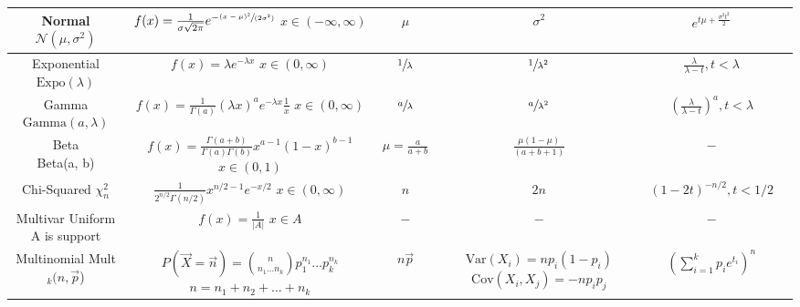 \documentclass[10pt,landscape]{article}
\theoremstyle{definition}
\newcommand{\var}{\textrm{Var}}
\newcommand{\cov}{\textrm{Cov}}
\newcommand{\N}{\mathcal{N}}
\newcommand{\Beta}{\textrm{Beta}}
\newcommand{\Gam}{\textrm{Gamma}}
\newcommand{\Expo}{\textrm{Expo}}
\newcommand{\Mult}{\textrm{Mult}}
\begin{document}
\begin{sidewaystable}
\begin{center}
\begin{tabular}{cccccc}
    \hline
    \shortstack{Normal \\ $\N(\mu, \sigma^2)$} & \shortstack{$f(x) = \frac{1}{\sigma \sqrt{2\pi}} e^{-\sfrac{(x - \mu)^2}{(2 \sigma^2)}}$ \\ $x \in (-\infty, \infty)$} & $\mu$  & $\sigma^2$ & $e^{t\mu + \frac{\sigma^2t^2}{2}}$\\
    \hline
    \shortstack{Exponential \\ $\Expo(\lambda)$} & \shortstack{$f(x) = \lambda e^{-\lambda x}$\\$ x \in (0, \infty)$} & $\sfrac{1}{\lambda}$  & $\sfrac{1}{\lambda^2}$ & $\frac{\lambda}{\lambda - t}, t < \lambda$\\
    \hline
    \shortstack{Gamma \\ $\Gam(a, \lambda)$} & \shortstack{$f(x) = \frac{1}{\Gamma(a)}(\lambda x)^ae^{-\lambda x}\frac{1}{x}$\\$ x \in (0, \infty)$} & $\sfrac{a}{\lambda}$  & $\sfrac{a}{\lambda^2}$ & $\left(\frac{\lambda}{\lambda - t}\right)^a, t < \lambda$\\
    \hline
    \shortstack{Beta \\ \Beta(a, b)} & \shortstack{$f(x) = \frac{\Gamma(a+b)}{\Gamma(a)\Gamma(b)}x^{a-1}(1-x)^{b-1}$\\$x \in (0, 1) $} & $\mu = \frac{a}{a + b}$  & $\frac{\mu(1-\mu)}{(a + b + 1)}$ & $-$\\
    \hline
    \shortstack{Chi-Squared \\ $\chi_n^2$} & \shortstack{$\frac{1}{2^{n/2}\Gamma(n/2)}x^{n/2 - 1}e^{-x/2}$\\$x \in (0, \infty) $} & $n$  & $2n$ & $(1 - 2t)^{-n/2}, t < 1/2$\\
    \hline
    \hline
    \shortstack{Multivar Uniform \\ A is support} & \shortstack{$f(x) = \frac{1}{|A|}$\\$  x \in A $} & $-$  & $-$ & $-$\\
    \hline
    \shortstack{Multinomial \\ \Mult$_k(n, \vec{p}$)} & \shortstack{$P(\vec{X} = \vec{n}) = {n \choose n_1\dots n_k}p_1^{n_1}\dots p_k^{n_k}$ \\ $n = n_1 + n_2 + \dots + n_k$} & $n\vec{p}$ & \shortstack{$\var(X_i) = np_i(1-p_i)$ \\ $\cov(X_i, X_j) = -np_ip_j$} & $\left(\sum_{i=1}^k p_ie^{t_i}\right)^n$ \\
    \hline
    \hline

    \end{tabular}



\end{center}
\end{sidewaystable}
\end{document}

